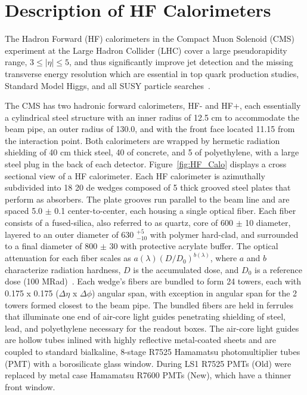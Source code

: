 \section{Description of HF Calorimeters}

The Hadron Forward (HF) calorimeters in the Compact Muon Solenoid (CMS)
experiment at the Large Hadron Collider (LHC) cover a large pseudorapidity
range, $3 \le |\eta| \le 5$, and thus significantly improve jet detection and the missing
transverse energy resolution which are essential in top quark production
studies, Standard Model Higgs, and all SUSY particle searches~\cite{CMSTP:1994,CMSTP:1997}.

The CMS has two hadronic forward calorimeters, HF- and HF+, each essentially a cylindrical steel
structure with an inner radius of 12.5 cm to accommodate the beam pipe, an outer radius of 130.0,
and with the front face located 11.15 from the interaction point. Both calorimeters are wrapped
by hermetic radiation shielding of 40 cm thick steel, 40 of concrete, and 5 of polyethylene,
with a large steel plug in the back of each detector. Figure~\ref{fig:HF_Calo} displays a cross
sectional view of a HF calorimeter. Each HF calorimeter is azimuthally subdivided into 18 20 de wedges
composed of 5 thick grooved steel plates that perform as absorbers. The plate grooves run
parallel to the beam line and are spaced 5.0 $\pm$ 0.1 center-to-center, each housing a single
optical fiber. Each fiber consists of a fused-silica, also referred to as quartz, core of 600 $\pm$
10 diameter, layered to an outer diameter of 630 $^{+5}_{-10}$ with polymer hard-clad, and
surrounded to a final diameter of 800 $\pm$ 30 with protective acrylate buffer. The optical
attenuation for each fiber scales as $a(\lambda)(D/D_0)^{b(\lambda)}$, where $a$ and $b$ characterize
radiation hardness, $D$ is the accumulated dose, and $D_0$ is a reference dose (100 MRad)~\cite{HFCC:2008}. Each
wedge's fibers are bundled to form 24 towers, each with 0.175 x 0.175 ($\Delta\eta$ x $\Delta\phi$)
angular span, with exception in angular span for the 2 towers formed closest to the beam pipe. The
bundled fibers are held in ferrules that illuminate one end of air-core light guides penetrating
shielding of steel, lead, and polyethylene necessary for the readout boxes. The air-core light
guides are hollow tubes inlined with highly reflective metal-coated sheets and are coupled to
standard bialkaline, 8-stage R7525 Hamamatsu photomultiplier tubes (PMT) with a borosilicate glass window. During LS1 R7525 PMTs (Old) were replaced by metal case Hamamatsu R7600 PMTs (New), which have a thinner front window.

